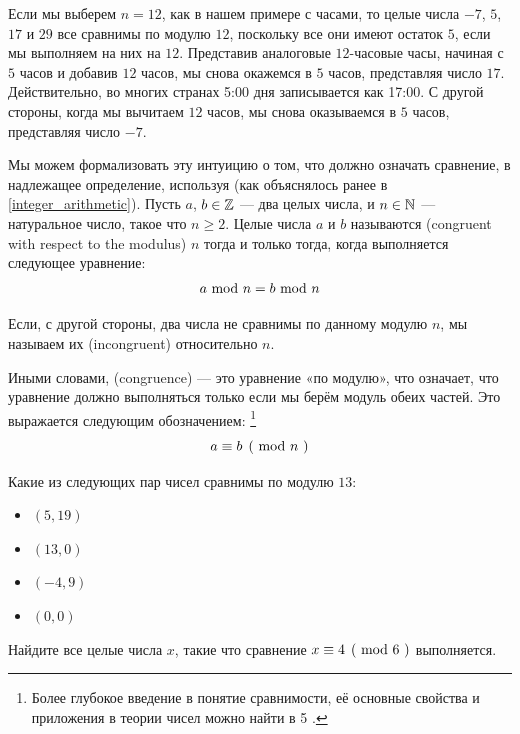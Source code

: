 \begin{example}
Если мы выберем $n=12$, как в нашем примере с часами, то целые числа $-7$, $5$, $17$ и $29$ все сравнимы по модулю $12$, поскольку все они имеют остаток $5$, если мы выполняем  на них на $12$. Представив аналоговые $12$-часовые часы, начиная с $5$ часов и добавив $12$ часов, мы снова окажемся в $5$ часов, представляя число $17$. Действительно, во многих странах 5:00 дня записывается как 17:00. С другой стороны, когда мы вычитаем $12$ часов, мы снова оказываемся в $5$ часов, представляя число $-7$.
\end{example}
Мы можем формализовать эту интуицию о том, что должно означать сравнение, в надлежащее определение, используя  (как объяснялось ранее в \ref{integer_arithmetic}). Пусть $ a $, $ b \in \mathbb{Z} $ — два целых числа, и $ n \in \mathbb{N} $ — натуральное число, такое что $n\geq 2$. Целые числа $ a $ и $ b $ называются  (congruent with respect to the modulus) $ n $ тогда и только тогда, когда выполняется следующее уравнение:
\begin{equation}
a \text{ mod } n = b \text{ mod } n
\end{equation}

Если, с другой стороны, два числа не сравнимы по данному модулю $n$, мы называем их  (incongruent) относительно $n$.

Иными словами,  (congruence) — это уравнение «по модулю», что означает, что уравнение должно выполняться только если мы берём модуль обеих частей. Это выражается следующим обозначением:
\footnote{Более глубокое введение в понятие сравнимости, её основные свойства и
приложения в теории чисел можно найти в \chaptname{} 5 \cite{hardy-2008}.}
\begin{equation}
\kongru{a}{b}{n}
\end{equation}
\begin{exercise}
Какие из следующих пар чисел сравнимы по модулю $13$:
\begin{itemize}\compactlist
\item $(5,19)$
\item $(13,0)$
\item $(-4,9)$
\item $(0,0)$
\end{itemize}
\end{exercise}
\begin{exercise}
Найдите все целые числа $x$, такие что сравнение $\kongru{x}{4}{6}$ выполняется.
\end{exercise}
